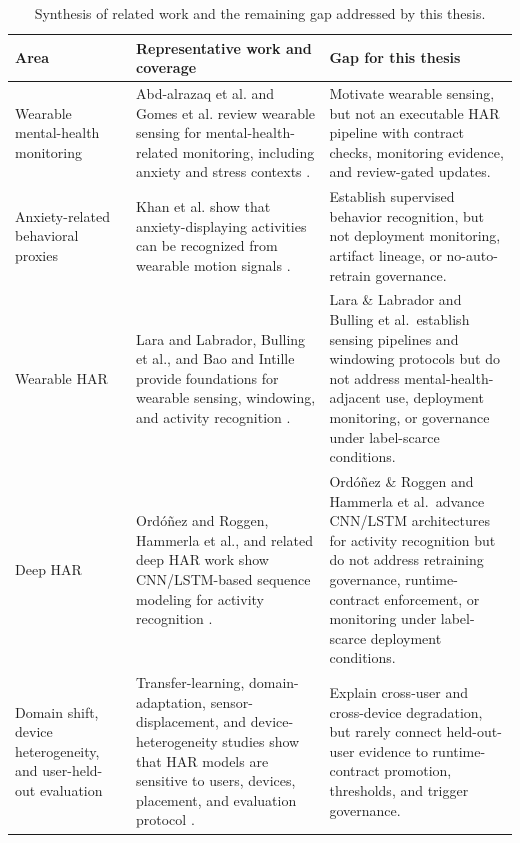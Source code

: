 \renewcommand{\arraystretch}{2}
\begin{table}[htbp]
\centering
\footnotesize
\caption[Synthesis of related work and the remaining gap addressed by this...]{Synthesis of related work and the remaining gap addressed by this thesis.}
\label{tab:related_work_synthesis}
\begin{tabularx}{\textwidth}{p{3.0cm} X X}
\toprule
\textbf{Area} & \textbf{Representative work and coverage} & \textbf{Gap for this thesis} \\
\midrule

Wearable mental-health monitoring
& Abd-alrazaq et al. and Gomes et al. review wearable sensing for mental-health-related monitoring, including anxiety and stress contexts \cite{abdalrazaq2023wearable,gomes2023mentalhealth}.
& Motivate wearable sensing, but not an executable HAR pipeline with contract checks, monitoring evidence, and review-gated updates. \\

Anxiety-related behavioral proxies
& Khan et al. show that anxiety-displaying activities can be recognized from wearable motion signals \cite{khan2021adamsense}.
& Establish supervised behavior recognition, but not deployment monitoring, artifact lineage, or no-auto-retrain governance. \\

Wearable HAR
& Lara and Labrador, Bulling et al., and Bao and Intille provide foundations for wearable sensing, windowing, and activity recognition \cite{lara2013survey,bulling2014tutorial,bao2004activity}.
& Lara \& Labrador and Bulling et al.\ establish sensing pipelines and windowing protocols but do not address mental-health-adjacent use, deployment monitoring, or governance under label-scarce conditions. \\

Deep HAR
& Ordóñez and Roggen, Hammerla et al., and related deep HAR work show CNN/LSTM-based sequence modeling for activity recognition \cite{ordonez2016deep,hammerla2016deep,wang2019sensorhar}.
& Ordóñez \& Roggen and Hammerla et al.\ advance CNN/LSTM architectures for activity recognition but do not address retraining governance, runtime-contract enforcement, or monitoring under label-scarce deployment conditions. \\

Domain shift, device heterogeneity, and user-held-out evaluation
& Transfer-learning, domain-adaptation, sensor-displacement, and device-heterogeneity studies show that HAR models are sensitive to users, devices, placement, and evaluation protocol \cite{dhekane2024transfer,chakma2023imuda,wang2024enhancing,stisen2015smart}.
& Explain cross-user and cross-device degradation, but rarely connect held-out-user evidence to runtime-contract promotion, thresholds, and trigger governance. \\


\end{tabularx}
\end{table}
